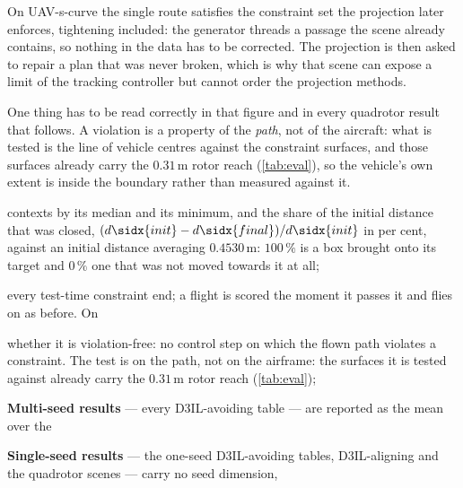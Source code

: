 
On
UAV-s-curve the
single route satisfies the constraint set the projection later enforces, tightening included: the
generator threads a passage the scene already contains, so nothing in the data has to be corrected. The
projection is then asked to repair a plan that was never broken, which is why that scene can expose a
limit of the tracking controller but cannot order the projection methods.

One thing has to be read correctly in that figure and in every quadrotor result that follows. A violation
is a property of the \emph{path}, not of the aircraft: what is tested is the line of vehicle centres
against the constraint surfaces, and those surfaces already carry the $0.31$\,m rotor reach
(\autoref{tab:eval}), so the vehicle's own extent is inside the boundary rather than measured against it.

    contexts by its median and its minimum, and the share of the initial distance that was closed,
    $(d\sidx{init}-d\sidx{final})/d\sidx{init}$ in per cent, against an initial distance averaging
    $0.4530$\,m: $100\,\%$ is a box brought onto its target and $0\,\%$ one that was not moved towards it
    at all;

every test-time constraint end; a flight is scored the moment it passes it and flies on as before. On

  \item whether it is violation-free: no control step on which the flown path violates a constraint. The
    test is on the path, not on the airframe: the surfaces it is tested against already carry the
    $0.31$\,m rotor reach (\autoref{tab:eval});

  \item \textbf{Multi-seed results} --- every D3IL-avoiding table --- are reported as the mean over the

  \item \textbf{Single-seed results} --- the one-seed D3IL-avoiding tables, D3IL-aligning and the
    quadrotor scenes --- carry no seed dimension,

